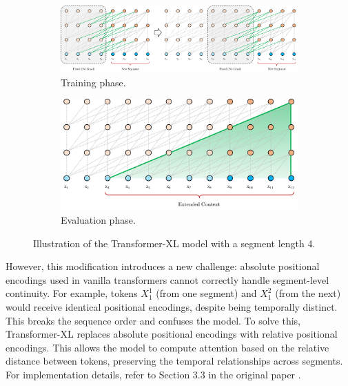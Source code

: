 \begin{figure}[!h]
	\begin{subfigure}[b]{0.62\linewidth}
		\includegraphics[width=\textwidth]{images/xl-train.pdf}
		\caption{\small Training phase.}
		\label{fig:xl-train}
	\end{subfigure}
	\begin{subfigure}[b]{0.35\linewidth}
		\includegraphics[width=\textwidth]{images/xl-eval.pdf}
		\caption{\small Evaluation phase.}
		\label{fig:xl-eval}
	\end{subfigure}
	\caption{\small Illustration of the Transformer-XL model with a segment length 4. \cite{dai2019transformerxlattentivelanguagemodels}}
	\label{fig:xl}
\end{figure}
However, this modification introduces a new challenge: absolute positional encodings used in vanilla transformers cannot 
correctly handle segment-level continuity. For example, tokens $X_1^1$ (from one segment) and $X_1^2$ (from the next) would 
receive identical positional encodings, despite being temporally distinct. This breaks the sequence order and confuses the 
model.\newline
To solve this, Transformer-XL replaces absolute positional encodings with relative positional encodings. This allows the model 
to compute attention based on the relative distance between tokens, preserving the temporal relationships across segments. For
implementation details, refer to Section 3.3 in the original paper \cite{dai2019transformerxlattentivelanguagemodels}.

